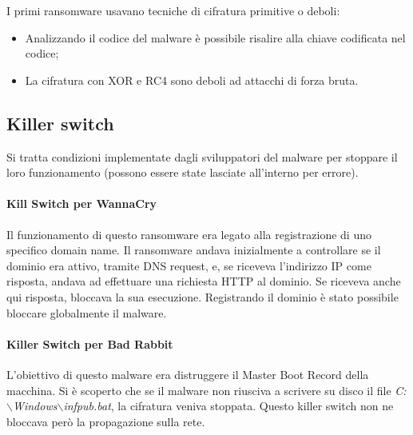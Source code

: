 \noindent I primi ransomware usavano tecniche di cifratura primitive o deboli:
\begin{itemize}
    \item Analizzando il codice del malware è possibile risalire alla chiave codificata nel codice;
    \item La cifratura con XOR e RC4 sono deboli ad attacchi di forza bruta.
\end{itemize}


\subsection{Killer switch}
Si tratta condizioni implementate dagli sviluppatori del malware per stoppare il loro funzionamento (possono essere state lasciate all'interno per errore).

\paragraph{Kill Switch per WannaCry} Il funzionamento di questo ransomware era legato alla registrazione di uno specifico domain name. Il ransomware andava inizialmente a controllare se il dominio era attivo, tramite DNS request, e, se riceveva l'indirizzo IP come risposta, andava ad effettuare una richiesta HTTP al dominio. Se riceveva anche qui risposta, bloccava la sua esecuzione. Registrando il dominio è stato possibile bloccare globalmente il malware.

\paragraph{Killer Switch per Bad Rabbit} L'obiettivo di questo malware era distruggere il Master Boot Record della macchina. Si è scoperto che se il malware non riusciva a scrivere su disco il file \textit{C:$\backslash$Windows$\backslash$infpub.bat}, la cifratura veniva stoppata. Questo killer switch non ne bloccava però la propagazione sulla rete.

